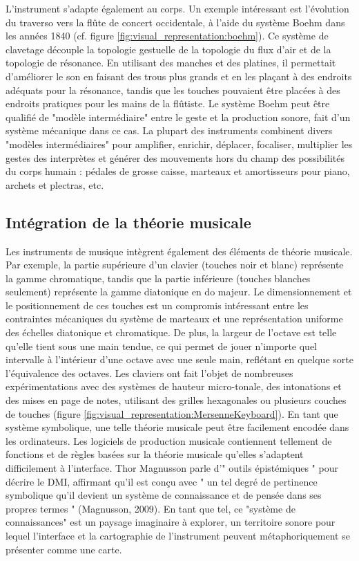 L'instrument s'adapte également au corps. Un exemple intéressant est l'évolution du traverso vers la flûte de concert occidentale, à l'aide du système Boehm dans les années 1840 (cf. figure \ref{fig:visual_representation:boehm}). Ce système de clavetage découple la topologie gestuelle de la topologie du flux d'air et de la topologie de résonance. En utilisant des manches et des platines, il permettait d'améliorer le son en faisant des trous plus grands et en les plaçant à des endroits adéquats pour la résonance, tandis que les touches pouvaient être placées à des endroits pratiques pour les mains de la flûtiste.
Le système Boehm peut être qualifié de "modèle intermédiaire" entre le geste et la production sonore, fait d'un système mécanique dans ce cas. La plupart des instruments combinent divers "modèles intermédiaires" pour amplifier, enrichir, déplacer, focaliser, multiplier les gestes des interprètes et générer des mouvements hors du champ des possibilités du corps humain : pédales de grosse caisse, marteaux et amortisseurs pour piano, archets et plectras, etc.

\subsection{Intégration de la théorie musicale}

Les instruments de musique intègrent également des éléments de théorie musicale. Par exemple, la partie supérieure d'un clavier (touches noir et blanc) représente la gamme chromatique, tandis que la partie inférieure (touches blanches seulement) représente la gamme diatonique en do majeur. Le dimensionnement et le positionnement de ces touches est un compromis intéressant entre les contraintes mécaniques du système de marteaux et une représentation uniforme des échelles diatonique et chromatique. De plus, la largeur de l'octave est telle qu'elle tient sous une main tendue, ce qui permet de jouer n'importe quel intervalle à l'intérieur d'une octave avec une seule main, reflétant en quelque sorte l'équivalence des octaves. Les claviers ont fait l'objet de nombreuses expérimentations avec des systèmes de hauteur micro-tonale, des intonations et des mises en page de notes, utilisant des grilles hexagonales ou plusieurs couches de touches (figure \ref{fig:visual_representation:MersenneKeyboard}). En tant que système symbolique, une telle théorie musicale peut être facilement encodée dans les ordinateurs. Les logiciels de production musicale contiennent tellement de fonctions et de règles basées sur la théorie musicale qu'elles s'adaptent difficilement à l'interface. Thor Magnusson parle d'" outils épistémiques " pour décrire le DMI, affirmant qu'il est conçu avec " un tel degré de pertinence symbolique qu'il devient un système de connaissance et de pensée dans ses propres termes " (Magnusson, 2009). En tant que tel, ce "système de connaissances" est un paysage imaginaire à explorer, un territoire sonore pour lequel l'interface et la cartographie de l'instrument peuvent métaphoriquement se présenter comme une carte.

